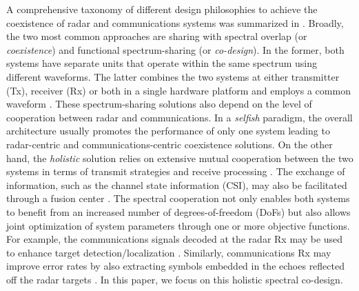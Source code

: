 \documentclass[10pt,journal]{IEEEtran}
\theoremstyle{definition}
\begin{document}
	\color{black}
	A comprehensive taxonomy of different design philosophies to achieve the coexistence of radar and communications systems was summarized in \cite{zheng2019overiview}. Broadly, the two most common approaches are sharing with spectral overlap (or \textit{coexistence}) and functional spectrum-sharing (or \textit{co-design}). In the former, both systems have separate units that operate within the same spectrum using different waveforms. %
	The latter combines the two systems at either transmitter (Tx), receiver (Rx) or both in a single hardware platform and employs a common waveform %
	\cite{mishra2019toward,liu2018mu,duggal2020doppler}%
	. %
	These spectrum-sharing solutions also depend on the level of cooperation between radar and communications. In a \textit{selfish} paradigm, the overall architecture usually promotes the performance of only one system leading to radar-centric \cite{alaee2019discrete,bao2019precoding,slavik2019cognitive,sedighi2020localization} and communications-centric \cite{ayyar2019robust} coexistence solutions. %
	On the other hand, the \textit{holistic} solution relies on extensive mutual cooperation between the two systems in terms of transmit strategies and receive processing \cite{mahal2017spectral,MCMIMO_RadComm,qian2018joint,rihan2018optimum,Lops2019serveillance,biswas2018fdqos,he2019performance}. The exchange of information, such as the channel state information (CSI), may also be facilitated through a fusion center \cite{MCMIMO_RadComm,he2019performance}.
	The spectral cooperation not only enables both systems to benefit from an increased number of degrees-of-freedom (DoFs) but also allows joint optimization of system parameters through one \cite{MCMIMO_RadComm,qian2018joint} or more \cite{biswas2018fdqos,dokhanchi2020multi} objective functions. For example, the communications signals decoded at the radar Rx may be used to enhance target detection/localization \cite{biswas2018fdqos,he2019performance}. Similarly, communications Rx may improve error rates by also extracting symbols embedded in the echoes reflected off the radar targets \cite{liu2018mimo}. In this paper, we focus on this holistic spectral co-design.
	
\end{document}
